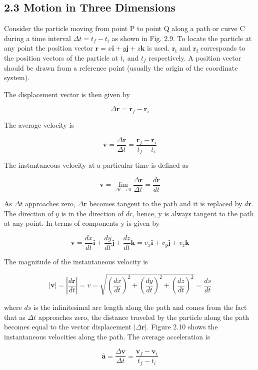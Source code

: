 \documentclass[10pt]{article}
\begin{document}
\subsection*{2.3 Motion in Three Dimensions}
Consider the particle moving from point P to point Q along a path or curve C during a time interval $\Delta t=t_{f}-t_{i}$ as shown in Fig. 2.9. To locate the particle at any point the position vector $\mathbf{r}=x \mathbf{i}+y \mathbf{j}+z \mathbf{k}$ is used. $\mathbf{r}_{\mathrm{i}}$ and $\mathbf{r}_{\mathrm{f}}$ corresponds to the position vectors of the particle at $t_{i}$ and $t_{f}$ respectively. A position vector should be drawn from a reference point (usually the origin of the coordinate system).

The displacement vector is then given by

$$
\Delta \mathbf{r}=\mathbf{r}_{f}-\mathbf{r}_{i}
$$

The average velocity is

$$
\overline{\mathbf{v}}=\frac{\Delta \mathbf{r}}{\Delta t}=\frac{\mathbf{r}_{f}-\mathbf{r}_{i}}{t_{f}-t_{i}}
$$

The instantaneous velocity at a particular time is defined as

$$
\mathbf{v}=\lim _{\Delta t \rightarrow 0} \frac{\Delta \mathbf{r}}{\Delta t}=\frac{d \mathbf{r}}{d t}
$$

As $\Delta t$ approaches zero, $\Delta \mathbf{r}$ becomes tangent to the path and it is replaced by $d \mathbf{r}$. The direction of $y$ is in the direction of $d r$, hence, y is always tangent to the path at any point. In terms of components y is given by

$$
\mathbf{v}=\frac{d x}{d t} \mathbf{i}+\frac{d y}{d t} \mathbf{j}+\frac{d z}{d t} \mathbf{k}=v_{x} \mathbf{i}+v_{y} \mathbf{j}+v_{z} \mathbf{k}
$$

The magnitude of the instantaneous velocity is

$$
|\mathbf{v}|=\left|\frac{d \mathbf{r}}{d t}\right|=v=\sqrt{\left(\frac{d x}{d t}\right)^{2}+\left(\frac{d y}{d t}\right)^{2}+\left(\frac{d z}{d t}\right)^{2}}=\frac{d s}{d t}
$$

where $d s$ is the infinitesimal arc length along the path and comes from the fact that as $\Delta t$ approaches zero, the distance traveled by the particle along the path becomes equal to the vector displacement $|\Delta \mathbf{r}|$. Figure 2.10 shows the instantaneous velocities along the path. The average acceleration is

$$
\overline{\mathbf{a}}=\frac{\Delta \mathbf{v}}{\Delta t}=\frac{\mathbf{v}_{f}-\mathbf{v}_{i}}{t_{f}-t_{i}}
$$
\end{document}
